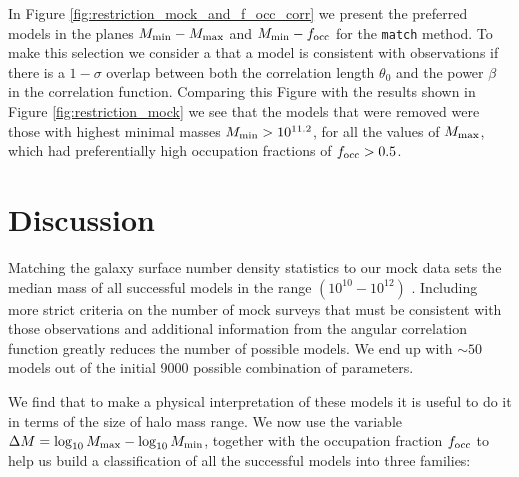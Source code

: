 \documentclass[usenatbib]{mn2e}
\newcommand{\hMsun}{{\ifmmode{h^{-1}{\rm
        {M_{\odot}}}}\else{$h^{-1}{\rm{M_{\odot}}}$}\fi}}
\begin{document}
In Figure \ref{fig:restriction_mock_and_f_occ_corr} we present the preferred
models in the planes $M_{\rm min}-M_{\rm  max}$ and $M_{\rm min}-f_{\rm occ}$
for the {\tt match} method. To make this selection we consider a that
a model is consistent with observations if there is a $1-\sigma$
overlap between both the correlation length $\theta_0$ and the power
$\beta$ in the correlation function. Comparing this Figure with the
results shown in Figure \ref{fig:restriction_mock} we see that the
models that were removed were those with highest minimal masses
$M_{\rm min}>10^{11.2}$, for all the values of $M_{\rm max}$, which
had preferentially high occupation fractions of $f_{\rm occ}> 0.5$. 









\section{Discussion}

Matching the galaxy surface number density statistics to
our mock  data sets the median
mass of all successful models in the range $(10^{10}-10^{12})$
\hMsun. Including more strict criteria on the number of mock surveys
that must be consistent with those observations and additional
information from the angular correlation function greatly reduces the
number of possible models. We end up with $\sim 50$ models out of the
initial 9000 possible combination of parameters.  

We find that to make a physical interpretation of these models it is
useful to do it in terms of the size of halo mass range. We now use the
variable $\Delta M=\log_{10}M_{\rm max} - \log_{10}M_{\rm  min}$, together
with the occupation fraction $f_{\rm occ}$ to help us build a classification
of all the successful models into three families: 
\end{document}
